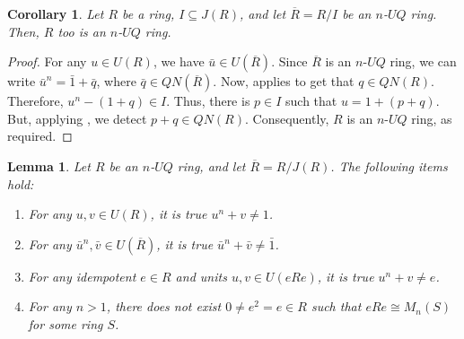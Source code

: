 \documentclass[10pt,a4paper]{amsart}
\newtheorem{lemma}[theorem]{Lemma}
\newtheorem{corollary}[theorem]{Corollary}
\begin{document}
\begin{corollary}\label{factor UQ}
Let $R$ be a ring, $I \subseteq J(R)$, and let $\overline{R} = R/I$ be an $n$-$UQ$ ring. Then, $R$ too is an $n$-$UQ$ ring.
\end{corollary}

\begin{proof}
For any $u \in U(R)$, we have $\bar{u} \in U(\overline{R})$. Since $\overline{R}$ is an $n$-$UQ$ ring, we can write ${\bar{u}}^n = \bar{1} + \bar{q}$, where $\bar{q} \in QN(\overline{R})$. Now, \cite[Lemma 4.1(1)]{daoa} applies to get that $q \in QN(R)$. Therefore, $u^n - (1 + q) \in I$. Thus, there is $p \in I$ such that $u = 1 + (p + q)$. But, applying \cite[Lemma 4.1(2)]{daoa}, we detect $p + q \in QN(R)$. Consequently, $R$ is an $n$-$UQ$ ring, as required.
\end{proof}

\begin{lemma}\label{sum two unit}
Let $R$ be an $n$-$UQ$ ring, and let $\overline{R} = R/J(R)$. The following items hold:
\begin{enumerate}
\item	
For any $u, v \in U(R)$, it is true $u^n + v \neq 1$.
\item	
For any $\bar{u}^n, \bar{v} \in U(\overline{R})$, it is true $\bar{u}^n + \bar{v} \neq \bar{1}$.
\item
For any idempotent $e \in R$ and units $u,v \in U(eRe)$, it is true $u^n + v \neq e$.
\item	
For any $n>1$, there does not exist $0 \neq e^2=e \in R$ such that $eRe \cong M_n(S)$ for some ring $S$.
\end{enumerate}
\end{lemma}
\end{document}
